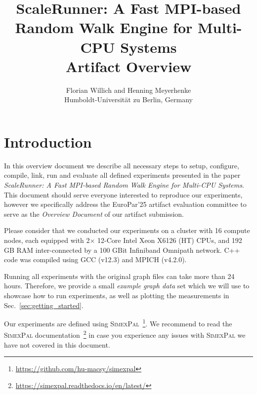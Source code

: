 \documentclass[11pt, a4paper]{scrartcl}
\newcommand{\simex}{\textsc{Simex\-Pal}\xspace}
\begin{document}
\lstset{  
  tabsize=2, 
  showspaces=false, 
  showstringspaces=false, 
  float=[htb], 
  captionpos=b, 
  basicstyle=\ttfamily\footnotesize,
  frame=single, %
  numbers=left, 
  numberstyle=\tiny, 
  numberblanklines=false, 
  breaklines=true
} 

\title{\small{ScaleRunner: A Fast MPI-based \\ Random Walk Engine for Multi-CPU Systems} \\ \LARGE{Artifact Overview}}

\author{Florian Willich and Henning Meyerhenke \\ Humboldt-Universit\"at zu Berlin, Germany}

\maketitle

\section{Introduction}

In this overview document we describe all necessary steps to setup, configure,
compile, link, run and evaluate all defined experiments presented in the paper
\textit{ScaleRunner: A Fast MPI-based Random Walk Engine for Multi-CPU Systems}.
This document should serve everyone interested to reproduce our experiments,
however we specifically address the EuroPar'25 artifact evaluation committee to
serve as the \emph{Overview Document} of our artifact submission.

Please consider that we conducted our experiments on a cluster with 16 compute
nodes, each equipped with 2$\times$ 12-Core Intel Xeon X6126 (HT) CPUs, and 192
GB RAM inter-connected by a 100 GBit Infiniband Omnipath network. C++ code was
compiled using GCC (v12.3) and MPICH (v4.2.0).

Running all experiments with the original graph files can take more than 24
hours. Therefore, we provide a small \emph{example graph data} set which we will
use to showcase how to run experiments, as well as plotting the measurements in
Sec.~\ref{sec:getting_started}.

Our experiments are defined using
\simex~\footnote{\url{https://github.com/hu-macsy/simexpal}}. We recommend to
read the \simex
documentation~\footnote{\url{https://simexpal.readthedocs.io/en/latest/}} in
case you experience any issues with \simex we have not covered in this
document.
\end{document}
